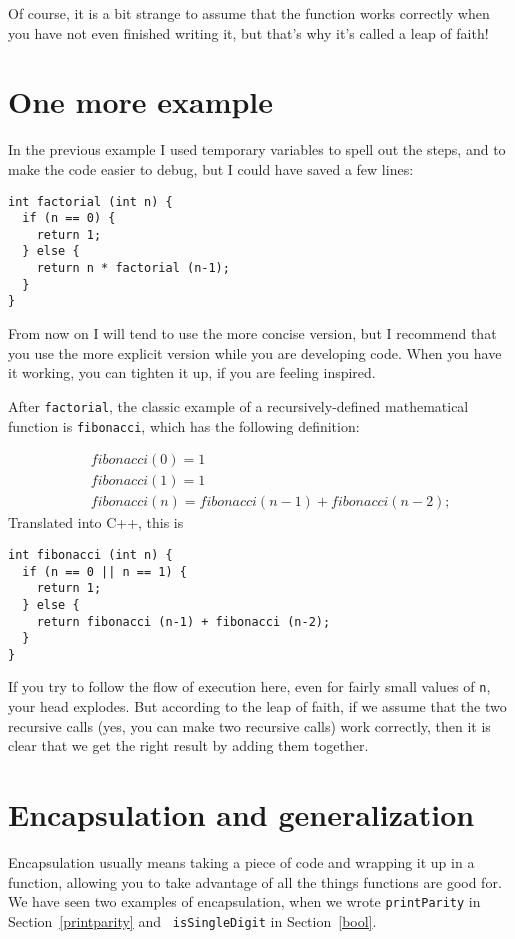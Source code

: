 Of course, it is a bit strange to assume that the function works
correctly when you have not even finished writing it, but that's why
it's called a leap of faith!

\section{One more example}

In the previous example I used temporary variables to spell out the
steps, and to make the code easier to debug, but I could have saved a
few lines:

\begin{verbatim}
int factorial (int n) {
  if (n == 0) {
    return 1;
  } else {
    return n * factorial (n-1);
  }
}
\end{verbatim}
%
From now on I will tend to use the more concise version, but
I recommend that you use the more explicit version while you
are developing code.   When you have it working, you can
tighten it up, if you are feeling inspired.

After {\tt factorial}, the classic example of a recursively-defined
mathematical function is {\tt fibonacci}, which has the
following definition:

\begin{eqnarray*}
&& fibonacci(0) = 1 \\
&& fibonacci(1) = 1 \\
&& fibonacci(n) = fibonacci(n-1) + fibonacci(n-2);
\end{eqnarray*}
%
Translated into C++, this is

\begin{verbatim}
int fibonacci (int n) {
  if (n == 0 || n == 1) {
    return 1;
  } else {
    return fibonacci (n-1) + fibonacci (n-2);
  }
}
\end{verbatim}
%
If you try to follow the flow of execution here, even for fairly small
values of {\tt n}, your head explodes.  But according to the leap of
faith, if we assume that the two recursive calls (yes, you can make
two recursive calls) work correctly, then it is clear that we get the
right result by adding them together.


\section {Encapsulation and generalization}

Encapsulation usually means taking a piece of code and wrapping it up
in a function, allowing you to take advantage of all the things functions
are good for.  We have seen two examples of encapsulation, when we
wrote {\tt printParity} in Section~\ref{printparity} and {\tt
isSingleDigit} in Section~\ref{bool}.

